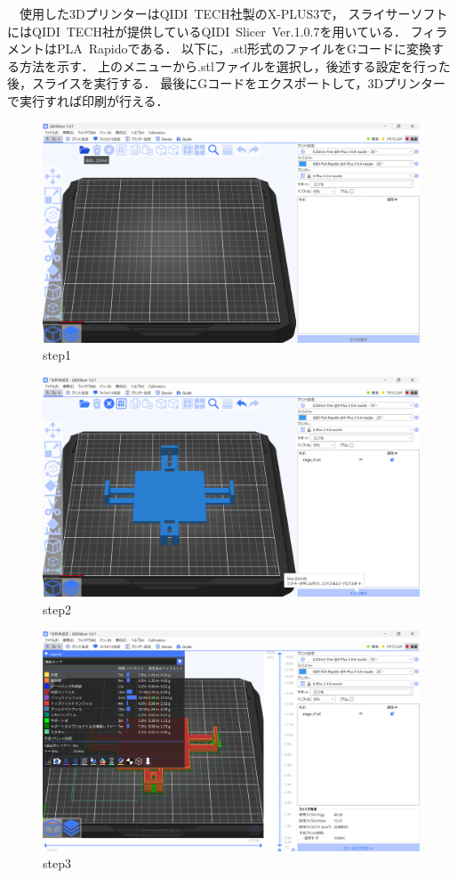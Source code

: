 　使用した3DプリンターはQIDI~TECH社製のX-PLUS3で，
スライサーソフトにはQIDI~TECH社が提供しているQIDI~Slicer~Ver.1.0.7を用いている．
フィラメントはPLA~Rapidoである．
以下に，.stl形式のファイルをGコードに変換する方法を示す．
上のメニューから.stlファイルを選択し，後述する設定を行った後，スライスを実行する．
最後にGコードをエクスポートして，3Dプリンターで実行すれば印刷が行える．
\begin{figure}[H]
	\centering
		\includegraphics[scale=0.225]{./figure/step1.png}
		\caption{step1}
		\label{fig:step1}
\end{figure}
\begin{figure}[H]
	\centering
		\includegraphics[scale=0.225]{./figure/step2.png}
		\caption{step2}
		\label{fig:step2}
\end{figure}
\begin{figure}[H]
	\centering
		\includegraphics[scale=0.225]{./figure/step3.png}
		\caption{step3}
		\label{fig:step3}
\end{figure}

